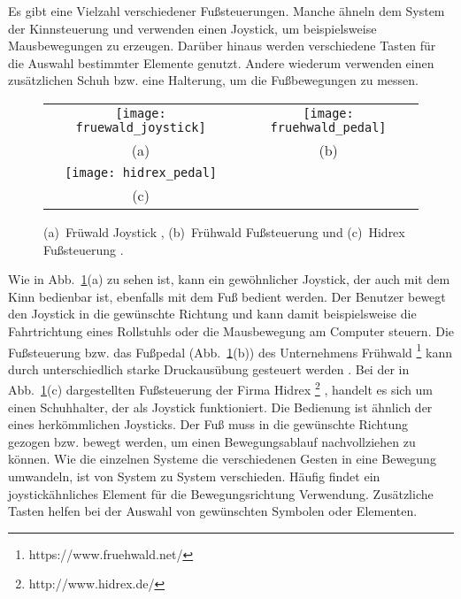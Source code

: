 Es gibt eine Vielzahl verschiedener Fußsteuerungen. Manche ähneln dem System der Kinnsteuerung und verwenden einen Joystick, um beispielsweise Mausbewegungen zu erzeugen. Darüber hinaus werden verschiedene Tasten für die Auswahl bestimmter Elemente genutzt. Andere wiederum verwenden einen zusätzlichen Schuh bzw. eine Halterung, um die Fußbewegungen zu messen.
%
%
\begin{figure}
\centering\small
\setlength{\tabcolsep}{0mm}	%
\begin{tabular}{c@{\hspace{0mm}}c} %
  \texttt{[image: fruewald\_joystick]} &
  \texttt{[image: fruehwald\_pedal]}
\\
  (a) & (b)
\\[7pt]	%
  \texttt{[image: hidrex\_pedal]}
\\
  (c)
\end{tabular}
%
\caption{(a)~Früwald Joystick \cite{FRUEHWALD}, (b)~Frühwald Fußsteuerung \cite{FRUEHWALD} und (c)~Hidrex Fußsteuerung \cite{HIDREX}.}
\label{fig:foot}
\end{figure}
%
%
\newline \newline
Wie in Abb.~\ref{fig:foot}(a) zu sehen ist, kann ein gewöhnlicher Joystick, der auch mit dem Kinn bedienbar ist, ebenfalls mit dem Fuß bedient werden. Der Benutzer bewegt den Joystick in die gewünschte Richtung und kann damit beispielsweise die Fahrtrichtung eines Rollstuhls oder die Mausbewegung am Computer steuern. Die Fußsteuerung bzw. das Fußpedal (Abb.~\ref{fig:foot}(b)) des Unternehmens Frühwald%
\footnote{https://www.fruehwald.net/}
%
kann durch unterschiedlich starke Druckausübung gesteuert werden \cite{FRUEHWALD}. 
\newline \newline
Bei der in Abb.~\ref{fig:foot}(c) dargestellten Fußsteuerung der Firma Hidrex%
\footnote{http://www.hidrex.de/}%
, handelt es sich um einen Schuhhalter, der als Joystick funktioniert. Die Bedienung ist ähnlich der eines herkömmlichen Joysticks. Der Fuß muss in die gewünschte Richtung gezogen bzw. bewegt werden, um einen Bewegungsablauf nachvollziehen zu können.
%
\newline \newline
Wie die einzelnen Systeme die verschiedenen Gesten in eine Bewegung umwandeln, ist von System zu System verschieden. Häufig findet ein joystickähnliches Element für die Bewegungsrichtung Verwendung. Zusätzliche Tasten helfen bei der Auswahl von gewünschten Symbolen oder Elementen.

